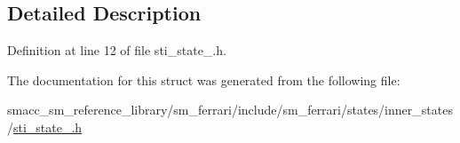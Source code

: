 \subsection{Detailed Description}


Definition at line 12 of file sti\+\_\+state\+\_.\+h.



The documentation for this struct was generated from the following file\+:\begin{DoxyCompactItemize}
\item 
smacc\+\_\+sm\+\_\+reference\+\_\+library/sm\+\_\+ferrari/include/sm\+\_\+ferrari/states/inner\+\_\+states/\hyperlink{sm__ferrari_2include_2sm__ferrari_2states_2inner__states_2sti__state__2_8h}{sti\+\_\+state\+\_.\+h}\end{DoxyCompactItemize}
